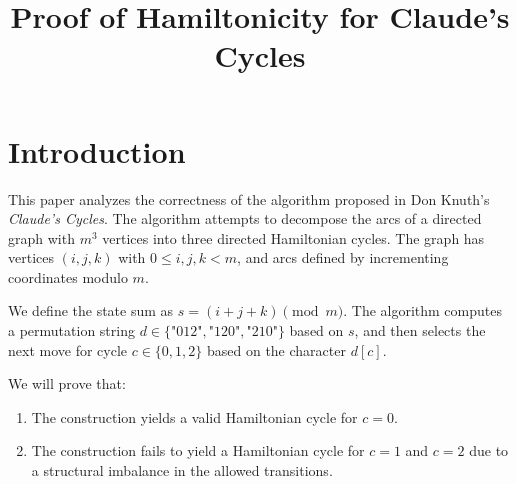 \documentclass[12pt]{article}
\title{Proof of Hamiltonicity for \textbf{Claude's Cycles}}
\author{}
\date{}
\begin{document}
\maketitle

\section{Introduction}
This paper analyzes the correctness of the algorithm proposed in Don Knuth's \textit{Claude's Cycles}. The algorithm attempts to decompose the arcs of a directed graph with $m^3$ vertices into three directed Hamiltonian cycles. The graph has vertices $(i, j, k)$ with $0 \le i, j, k < m$, and arcs defined by incrementing coordinates modulo $m$.

We define the state sum as $s = (i + j + k) \pmod m$. The algorithm computes a permutation string $d \in \{\text{"012"}, \text{"120"}, \text{"210"}\}$ based on $s$, and then selects the next move for cycle $c \in \{0, 1, 2\}$ based on the character $d[c]$.

We will prove that:
\begin{enumerate}
    \item The construction yields a valid Hamiltonian cycle for $c=0$.
    \item The construction fails to yield a Hamiltonian cycle for $c=1$ and $c=2$ due to a structural imbalance in the allowed transitions.
\end{enumerate}
\end{document}

